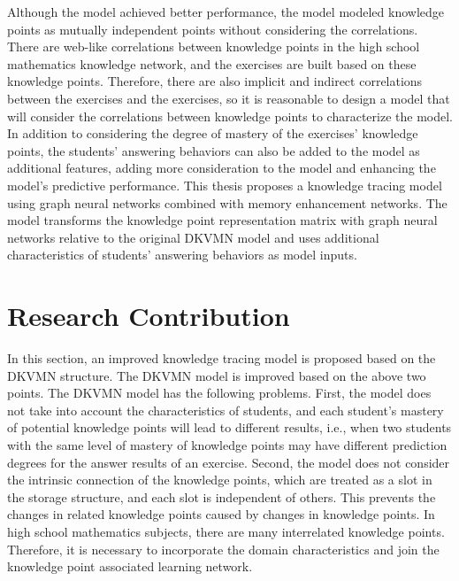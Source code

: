 Although the model achieved better performance, the model modeled knowledge points as mutually independent points without considering the correlations. There are web-like correlations between knowledge points in the high school mathematics knowledge network, and the exercises are built based on these knowledge points. Therefore, there are also implicit and indirect correlations between the exercises and the exercises, so it is reasonable to design a model that will consider the correlations between knowledge points to characterize the model. In addition to considering the degree of mastery of the exercises' knowledge points, the students' answering behaviors can also be added to the model as additional features, adding more consideration to the model and enhancing the model's predictive performance. This thesis proposes a knowledge tracing model using graph neural networks combined with memory enhancement networks. The model transforms the knowledge point representation matrix with graph neural networks relative to the original DKVMN model and uses additional characteristics of students' answering behaviors as model inputs.

\section{Research Contribution}
In this section, an improved knowledge tracing model is proposed based on the DKVMN structure. The DKVMN model is improved based on the above two points. The DKVMN model has the following problems. First, the model does not take into account the characteristics of students, and each student's mastery of potential knowledge points will lead to different results, i.e., when two students with the same level of mastery of knowledge points may have different prediction degrees for the answer results of an exercise. Second, the model does not consider the intrinsic connection of the knowledge points, which are treated as a slot in the storage structure, and each slot is independent of others. This prevents the changes in related knowledge points caused by changes in knowledge points. In high school mathematics subjects, there are many interrelated knowledge points. Therefore, it is necessary to incorporate the domain characteristics and join the knowledge point associated learning network.

